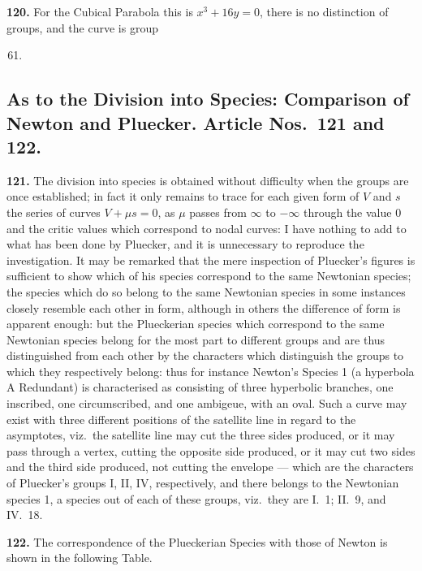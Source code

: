 \documentclass[11pt,a4paper]{article}
\theoremstyle{plain}
\begin{document}
\noindent\textbf{120.} For the Cubical Parabola this is $x^3 + 16y = 0$, there is no distinction of groups, and the curve is group
\begin{enumerate}[label=\textsc{\Roman*.},nosep]
\setcounter{enumi}{60}
\item
\end{enumerate}

\subsection*{As to the Division into Species: Comparison of Newton and Pluecker. Article Nos.\ 121 and 122.}

\noindent\textbf{121.} The division into species is obtained without difficulty when the groups are once established; in fact it only remains to trace for each given form of $V$ and $s$ the series of curves $V + \mu s = 0$, as $\mu$ passes from $\infty$ to $-\infty$ through the value $0$ and the critic values which correspond to nodal curves: I have nothing to add to what has been done by Pluecker, and it is unnecessary to reproduce the investigation. It may be remarked that the mere inspection of Pluecker's figures is sufficient to show which of his species correspond to the same Newtonian species; the species which do so belong to the same Newtonian species in some instances closely resemble each other in form, although in others the difference of form is apparent enough: but the Plueckerian species which correspond to the same Newtonian species belong for the most part to different groups and are thus distinguished from each other by the characters which distinguish the groups to which they respectively belong: thus for instance Newton's Species 1 (a hyperbola A Redundant) is characterised as consisting of three hyperbolic branches, one inscribed, one circumscribed, and one ambigeue, with an oval. Such a curve may exist with three different positions of the satellite line in regard to the asymptotes, viz.\ the satellite line may cut the three sides produced, or it may pass through a vertex, cutting the opposite side produced, or it may cut two sides and the third side produced, not cutting the envelope --- which are the characters of Pluecker's groups I, II, IV, respectively, and there belongs to the Newtonian species 1, a species out of each of these groups, viz.\ they are I.~1; II.~9, and IV.~18.

\noindent\textbf{122.} The correspondence of the Plueckerian Species with those of Newton is shown in the following Table.
\end{document}
